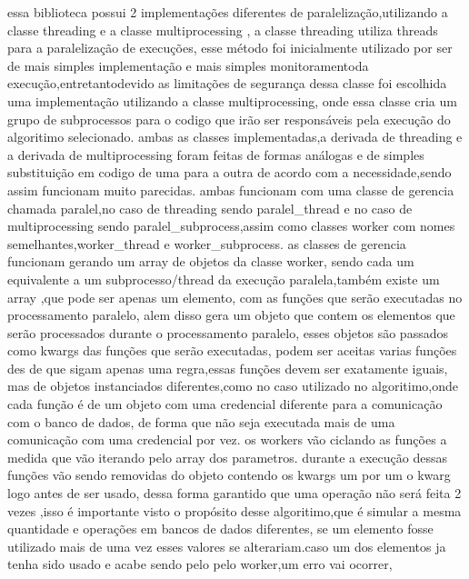 \documentclass[
	12pt,				%
	openright,			%
	oneside,			%
	a4paper,			%
	english,			%
	french,				%
	spanish,			%
	brazil,				%
	]{abntex2}
\begin{document}
essa biblioteca possui 2 implementações diferentes de paralelização,utilizando a classe threading \cite{threading} e a classe multiprocessing \cite{multiprocessing},
a classe threading utiliza threads para a paralelização de execuções,
esse método foi inicialmente utilizado por ser de mais simples implementação e mais simples monitoramentoda execução,entretantodevido as limitações de segurança dessa classe foi escolhida uma implementação utilizando a classe multiprocessing,
onde essa classe cria um grupo de subprocessos para o codigo que irão ser responsáveis pela execução do algoritimo selecionado.
ambas as classes implementadas,a derivada de threading e a derivada de multiprocessing foram feitas de formas análogas e de simples substituição em codigo de uma para a outra de acordo com a necessidade,sendo assim funcionam muito parecidas.
ambas funcionam com uma classe de gerencia chamada paralel,no caso de threading sendo paralel_thread e no caso de multiprocessing sendo paralel_subprocess,assim como classes worker com nomes semelhantes,worker_thread e worker_subprocess.
as classes de gerencia funcionam gerando um array de objetos da classe worker,
sendo cada um equivalente a um subprocesso/thread da execução paralela,também existe um array ,que pode ser apenas um elemento,
com as funções que serão executadas no processamento paralelo,
alem disso gera um objeto que contem os elementos que serão processados durante o processamento paralelo,
esses objetos são passados como kwargs das funções que serão executadas,
podem ser aceitas varias funções des de que sigam apenas uma regra,essas funções devem ser exatamente iguais,
mas de objetos instanciados diferentes,como no caso utilizado no algoritimo,onde cada função é de um objeto com uma credencial diferente para a comunicação com o banco de dados,
de forma que não seja executada mais de uma comunicação com uma credencial por vez.
os workers vão ciclando as funções a medida que vão iterando pelo array dos parametros.
durante a execução dessas funções vão sendo removidas do objeto contendo os kwargs um por um o kwarg logo antes de ser usado,
dessa forma garantido que uma operação não será feita 2 vezes ,isso é importante visto o propósito desse algoritimo,que é simular a mesma quantidade e operações em bancos de dados diferentes,
se um elemento fosse utilizado mais de uma vez esses valores se alterariam.caso um dos elementos ja tenha sido usado e acabe sendo pelo pelo worker,um erro vai ocorrer,
\end{document}
